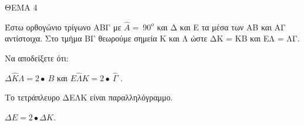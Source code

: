 
ΘΕΜΑ 4

Έστω ορθογώνιο τρίγωνο ΑΒΓ με $\widehat{Α} = \ 90^{ο}$ και Δ και Ε τα μέσα των ΑΒ και ΑΓ αντίστοιχα. Στο τμήμα ΒΓ θεωρούμε σημεία Κ και Λ ώστε ΔΚ = ΚΒ και ΕΛ = ΛΓ.

Να αποδείξετε ότι:

\begin{alist}
\item $\Delta\widehat{Κ}\Lambda = 2 \bullet \ \widehat{Β}$ και $Ε\widehat{\Lambda}Κ = 2 \bullet \ \widehat{\Gamma}$ . 

\item Το τετράπλευρο ΔΕΛΚ είναι παραλληλόγραμμο. 

\item $\Delta Ε = 2 \bullet \Delta Κ$. 


\end{alist}
